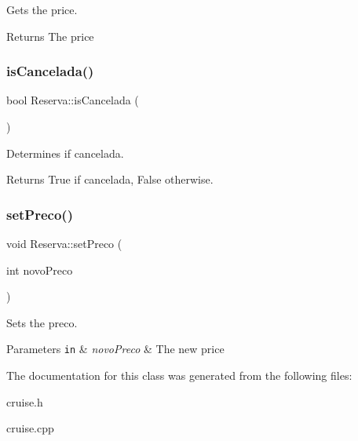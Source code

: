 Gets the price. 

\begin{DoxyReturn}{Returns}
The price 
\end{DoxyReturn}
\mbox{\label{classReserva_a1fb3e7e1dfce5960dc888ac9929f014f}} 
\subsubsection{\texorpdfstring{is\+Cancelada()}{isCancelada()}}
{\footnotesize\ttfamily bool Reserva\+::is\+Cancelada (\begin{DoxyParamCaption}{ }\end{DoxyParamCaption})\hspace{0.3cm}{\ttfamily [inline]}}



Determines if cancelada. 

\begin{DoxyReturn}{Returns}
True if cancelada, False otherwise. 
\end{DoxyReturn}
\mbox{\label{classReserva_ac2d3c756eb1abc03f0661cc97e1600e6}} 
\subsubsection{\texorpdfstring{set\+Preco()}{setPreco()}}
{\footnotesize\ttfamily void Reserva\+::set\+Preco (\begin{DoxyParamCaption}\item[{int}]{novo\+Preco }\end{DoxyParamCaption})\hspace{0.3cm}{\ttfamily [inline]}}



Sets the preco. 


\begin{DoxyParams}[1]{Parameters}
\mbox{\tt in}  & {\em novo\+Preco} & The new price \\
\hline
\end{DoxyParams}


The documentation for this class was generated from the following files\+:\begin{DoxyCompactItemize}
\item 
cruise.\+h\item 
cruise.\+cpp\end{DoxyCompactItemize}
